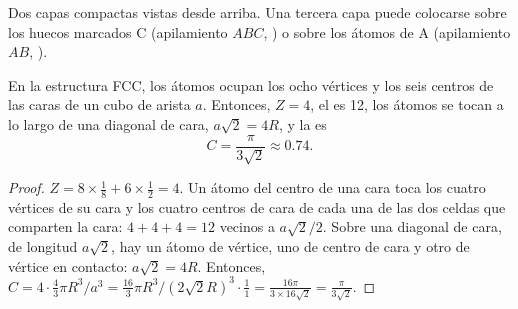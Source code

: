 \begin{omfigure}

{\small Dos capas compactas vistas desde arriba. Una tercera capa puede
colocarse sobre los huecos marcados C (apilamiento $ABC$, ) o sobre los átomos de A (apilamiento $AB$, ).}
\end{omfigure}

\begin{proposition}\label{prop:b1:crystals-metals:fcc}
En la estructura FCC, los átomos ocupan los ocho vértices y los seis
centros de las caras de un cubo de arista $a$. Entonces, $Z = 4$, el
 es 12, los átomos se tocan a lo largo de una
diagonal de cara, $a\sqrt2 = 4R$, y la  es
\[
  C = \frac{\pi}{3\sqrt2} \approx 0.74 .
\]
\end{proposition}

\begin{proof}
$Z = 8 \times \frac18 + 6 \times \frac12 = 4$. Un átomo del centro de una
cara toca los cuatro vértices de su cara y los cuatro centros de cara de
cada una de las dos celdas que comparten la cara: $4 + 4 + 4 = 12$
vecinos a $a\sqrt2/2$. Sobre una diagonal de cara, de longitud
$a\sqrt2$, hay un átomo de vértice, uno de centro de cara y otro de
vértice en contacto: $a\sqrt2 = 4R$. Entonces,
$C = 4 \cdot \frac43\pi R^3/a^3 = \frac{16}{3}\pi R^3/(2\sqrt2 R)^3 \cdot
\frac{1}{1} = \frac{16\pi}{3 \times 16\sqrt2} = \frac{\pi}{3\sqrt2}$.
\end{proof}

